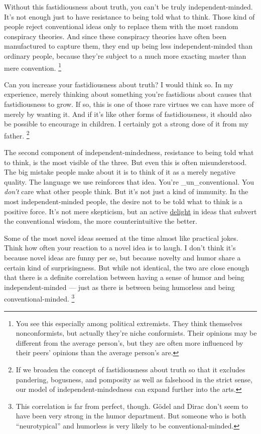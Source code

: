 Without this fastidiousness about truth, you can't be truly
independent-minded. It's not enough just to have resistance to being
told what to think. Those kind of people reject conventional ideas only
to replace them with the most random conspiracy theories. And since
these conspiracy theories have often been manufactured to capture them,
they end up being less independent-minded than ordinary people, because
they're subject to a much more exacting master than mere convention.
\footnote{You see this especially among political extremists. They think
themselves nonconformists, but actually they're niche conformists. Their
opinions may be different from the average person's, but they are often
more influenced by their peers' opinions than the average person's are.}

Can you increase your fastidiousness about truth? I would think so. In
my experience, merely thinking about something you're fastidious about
causes that fastidiousness to grow. If so, this is one of those rare
virtues we can have more of merely by wanting it. And if it's like other
forms of fastidiousness, it should also be possible to encourage in
children. I certainly got a strong dose of it from my father.
\footnote{If we broaden the concept of fastidiousness about truth so that
it excludes pandering, bogusness, and pomposity as well as falsehood in
the strict sense, our model of independent-mindedness can expand further
into the arts.}

The second component of independent-mindedness, resistance to being told
what to think, is the most visible of the three. But even this is often
misunderstood. The big mistake people make about it is to think of it as
a merely negative quality. The language we use reinforces that idea.
You're \_un\_conventional. You \emph{don't} care what other people
think. But it's not just a kind of immunity. In the most
independent-minded people, the desire not to be told what to think is a
positive force. It's not mere skepticism, but an active
\href{gba.html}{delight} in ideas that subvert the conventional wisdom,
the more counterintuitive the better.

Some of the most novel ideas seemed at the time almost like practical
jokes. Think how often your reaction to a novel idea is to laugh. I
don't think it's because novel ideas are funny per se, but because
novelty and humor share a certain kind of surprisingness. But while not
identical, the two are close enough that there is a definite correlation
between having a sense of humor and being independent-minded --- just as
there is between being humorless and being conventional-minded.
\footnote{This correlation is far from perfect, though. Gödel and Dirac
don't seem to have been very strong in the humor department. But someone
who is both ``neurotypical'' and humorless is very likely to be
conventional-minded.}

